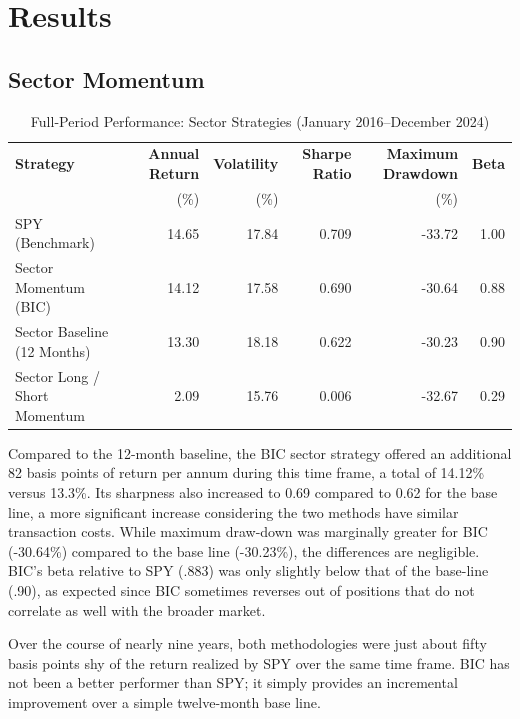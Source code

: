 \documentclass[12pt]{article}
\begin{document}
\section{Results}

\subsection{Sector Momentum}

\begin{table}[h]
\centering
\caption{Full-Period Performance: Sector Strategies (January 2016--December 2024)}
\label{tab:sector_perf}
\begin{tabular}{lrrrrr}
\hline
\textbf{Strategy} &
\textbf{Annual Return} &
\textbf{Volatility} &
\textbf{Sharpe Ratio} &
\textbf{Maximum Drawdown} &
\textbf{Beta} \\
& (\%) & (\%) & & (\%) & \\
\hline
SPY (Benchmark) & 14.65 & 17.84 & 0.709 & -33.72 & 1.00 \\
Sector Momentum (BIC) & 14.12 & 17.58 & 0.690 & -30.64 & 0.88 \\
Sector Baseline (12 Months) & 13.30 & 18.18 & 0.622 & -30.23 & 0.90 \\
Sector Long / Short Momentum & 2.09 & 15.76 & 0.006 & -32.67 & 0.29 \\
\hline
\end{tabular}
\end{table}

Compared to the 12-month baseline, the BIC sector strategy offered an additional 82 basis points of return per annum during this time frame, a total of 14.12\% versus 13.3\%. Its sharpness also increased to 0.69 compared to 0.62 for the base line, a more significant increase considering the two methods have similar transaction costs. While maximum draw-down was marginally greater for BIC (-30.64\%) compared to the base line (-30.23\%), the differences are negligible. BIC's beta relative to SPY (.883) was only slightly below that of the base-line (.90), as expected since BIC sometimes reverses out of positions that do not correlate as well with the broader market.

Over the course of nearly nine years, both methodologies were just about fifty basis points shy of the return realized by SPY over the same time frame. BIC has not been a better performer than SPY; it simply provides an incremental improvement over a simple twelve-month base line.
\end{document}
